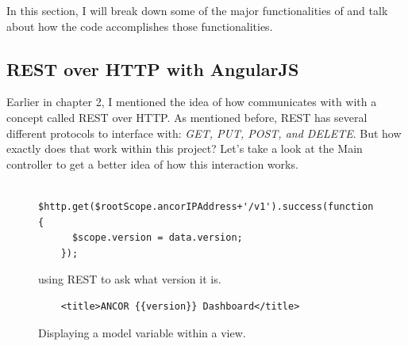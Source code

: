 In this section, I will break down some of the major functionalities of \projectName{} and talk about how the code accomplishes those functionalities.

\subsection{REST over HTTP with AngularJS}

Earlier in chapter 2, I mentioned the idea of how \projectName{} communicates with \ancor{} with a concept called REST over HTTP. As mentioned before, REST has several different protocols to interface with: \emph{GET, PUT, POST, and DELETE}. But how exactly does that work within this project? Let's take a look at the Main controller to get a better idea of how this interaction works.

\begin{figure}[H]
  \begin{center}
    \renewcommand{\theFancyVerbLine}{
      \sffamily\textcolor[rgb]{0.5,0.5,0.5}{\scriptsize\arabic{FancyVerbLine}}}
    \begin{verbatim}
    $http.get($rootScope.ancorIPAddress+'/v1').success(function(data) {
      $scope.version = data.version;
    });
    \end{verbatim}

  \end{center}
  \caption{\projectName{} using REST to ask \ancor{} what version it is.}
  \label{httpGET}
\end{figure}

\begin{figure}[H]
  \begin{center}
    \renewcommand{\theFancyVerbLine}{
      \sffamily\textcolor[rgb]{0.5,0.5,0.5}{\scriptsize\arabic{FancyVerbLine}}}
    \begin{verbatim}
    <title>ANCOR {{version}} Dashboard</title>
    \end{verbatim}

  \end{center}
  \caption{Displaying a model variable within a view.}
  \label{modelView}
\end{figure}

